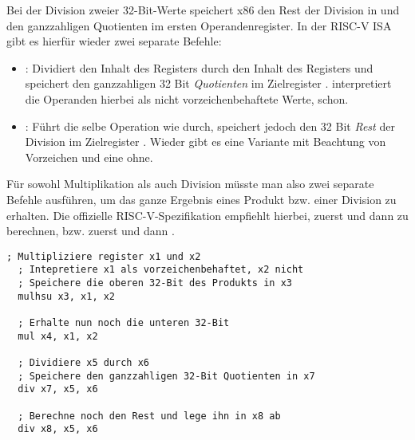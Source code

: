 Bei der Division zweier 32-Bit-Werte speichert x86 den Rest der Division in
 und den ganzzahligen Quotienten im ersten Operandenregister. In der
RISC-V ISA gibt es hierfür wieder zwei separate Befehle:

\begin{itemize}
\item {}: Dividiert den Inhalt des Registers 
  durch den Inhalt des Registers  und speichert den ganzzahligen 32 Bit
  \emph{Quotienten} im Zielregister .  interpretiert die
  Operanden hierbei als nicht vorzeichenbehaftete Werte,  schon.
  \item {}: Führt die selbe Operation wie 
    durch, speichert jedoch den 32 Bit \emph{Rest} der Division im Zielregister
    . Wieder gibt es eine Variante mit Beachtung von Vorzeichen und
    eine ohne.
\end{itemize}

Für sowohl Multiplikation als auch Division müsste man also zwei separate
Befehle ausführen, um das ganze Ergebnis eines Produkt bzw. einer Division zu
erhalten. Die offizielle RISC-V-Spezifikation empfiehlt hierbei, zuerst
 und dann  zu berechnen, bzw. zuerst 
und dann .

\begin{lstlisting}[style=risc-v_Assembler]
  ; Multipliziere register x1 und x2
  ; Intepretiere x1 als vorzeichenbehaftet, x2 nicht
  ; Speichere die oberen 32-Bit des Produkts in x3
  mulhsu x3, x1, x2

  ; Erhalte nun noch die unteren 32-Bit
  mul x4, x1, x2

  ; Dividiere x5 durch x6
  ; Speichere den ganzzahligen 32-Bit Quotienten in x7
  div x7, x5, x6

  ; Berechne noch den Rest und lege ihn in x8 ab
  div x8, x5, x6
\end{lstlisting}
